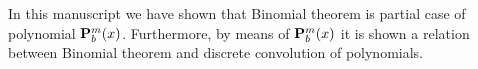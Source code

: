 In this manuscript we have shown that Binomial theorem is partial case of polynomial ${\mathbf{P}}\sp{m} \sb{b}(x)$.
Furthermore, by means of ${\mathbf{P}}\sp{m} \sb{b}(x)$ it is shown a relation between Binomial theorem
and discrete convolution of polynomials.